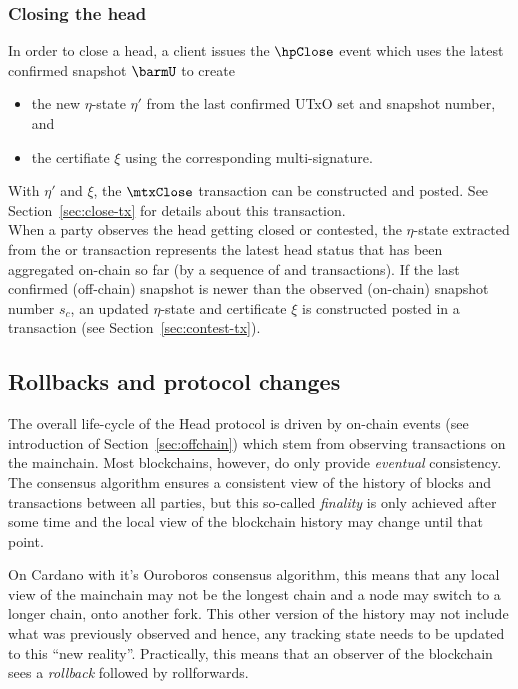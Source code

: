 \subsubsection{Closing the head}

\quad In order to close a head, a client issues the
$\hpClose$ event which uses the latest confirmed snapshot $\barmU$ to create
\begin{itemize}
	\item the new $\eta$-state $\eta'$ from the last confirmed UTxO set and snapshot
	      number, and
	\item the certifiate $\xi$ using the corresponding multi-signature.
\end{itemize}
With $\eta'$ and $\xi$, the $\mtxClose$ transaction can be constructed and
posted. See Section~\ref{sec:close-tx} for details about this transaction. \\

\quad When a party observes
the head getting closed or contested, the $\eta$-state extracted from the
\mtxClose{} or \mtxContest{} transaction represents the latest head status that
has been aggregated on-chain so far (by a sequence of \mtxClose{} and
\mtxContest{} transactions). If the last confirmed (off-chain) snapshot is newer
than the observed (on-chain) snapshot number $s_{c}$, an updated $\eta$-state
and certificate $\xi$ is constructed posted in a \mtxContest{} transaction (see
Section~\ref{sec:contest-tx}).

\subsection{Rollbacks and protocol changes}\label{sec:rollbacks}

The overall life-cycle of the Head protocol is driven by on-chain events (see
introduction of Section~\ref{sec:offchain}) which stem from observing
transactions on the mainchain. Most blockchains, however, do only provide
\emph{eventual} consistency. The consensus algorithm ensures a consistent view
of the history of blocks and transactions between all parties, but this
so-called \emph{finality} is only achieved after some time and the local view of
the blockchain history may change until that point.

On Cardano with it's Ouroboros consensus algorithm, this means that any local
view of the mainchain may not be the longest chain and a node may switch to a
longer chain, onto another fork. This other version of the history may not
include what was previously observed and hence, any tracking state needs to be
updated to this ``new reality''. Practically, this means that an observer of the
blockchain sees a \emph{rollback} followed by rollforwards.

